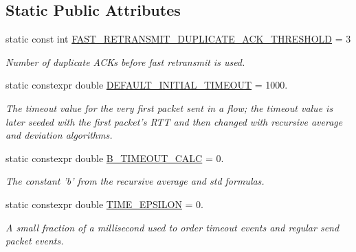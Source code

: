 \subsection*{Static Public Attributes}
\begin{DoxyCompactItemize}
\item 
static const int \hyperlink{classnetflow_ace7122626410ab50fbe69dcc0f77dcb0}{F\-A\-S\-T\-\_\-\-R\-E\-T\-R\-A\-N\-S\-M\-I\-T\-\_\-\-D\-U\-P\-L\-I\-C\-A\-T\-E\-\_\-\-A\-C\-K\-\_\-\-T\-H\-R\-E\-S\-H\-O\-L\-D} = 3
\begin{DoxyCompactList}\small\item\em Number of duplicate A\-C\-Ks before fast retransmit is used. \end{DoxyCompactList}\item 
\hypertarget{classnetflow_a7dd619873b5d292074adc5d4ec0aa103}{static constexpr double \hyperlink{classnetflow_a7dd619873b5d292074adc5d4ec0aa103}{D\-E\-F\-A\-U\-L\-T\-\_\-\-I\-N\-I\-T\-I\-A\-L\-\_\-\-T\-I\-M\-E\-O\-U\-T} = 1000.}\label{classnetflow_a7dd619873b5d292074adc5d4ec0aa103}

\begin{DoxyCompactList}\small\item\em The timeout value for the very first packet sent in a flow; the timeout value is later seeded with the first packet's R\-T\-T and then changed with recursive average and deviation algorithms. \end{DoxyCompactList}\item 
static constexpr double \hyperlink{classnetflow_a0461fac67c5f304973461a1644b58dd3}{B\-\_\-\-T\-I\-M\-E\-O\-U\-T\-\_\-\-C\-A\-L\-C} = 0.
\begin{DoxyCompactList}\small\item\em The constant 'b' from the recursive average and std formulas. \end{DoxyCompactList}\item 
\hypertarget{classnetflow_abfab6219768889c4b22a382d3be2147d}{static constexpr double \hyperlink{classnetflow_abfab6219768889c4b22a382d3be2147d}{T\-I\-M\-E\-\_\-\-E\-P\-S\-I\-L\-O\-N} = 0.}\label{classnetflow_abfab6219768889c4b22a382d3be2147d}

\begin{DoxyCompactList}\small\item\em A small fraction of a millisecond used to order timeout events and regular send packet events. \end{DoxyCompactList}\end{DoxyCompactItemize}


